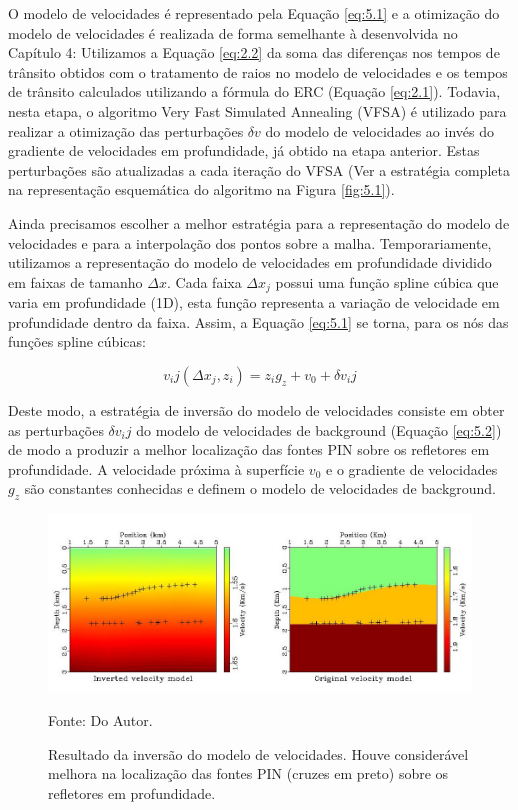 O modelo de velocidades é representado pela Equação \ref{eq:5.1} e a
otimização do modelo de velocidades é realizada de forma semelhante à desenvolvida no Capítulo 4:
Utilizamos a Equação \ref{eq:2.2} da soma das diferenças nos tempos de trânsito obtidos com o tratamento de raios no modelo de velocidades e os tempos de trânsito calculados utilizando a fórmula do ERC (Equação \ref{eq:2.1}). Todavia, nesta etapa, o algoritmo Very Fast Simulated Annealing (VFSA) é utilizado para realizar a otimização das perturbações $\delta v$ do modelo de velocidades ao invés do gradiente de velocidades em
profundidade, já obtido na etapa anterior. Estas perturbações são atualizadas a cada iteração do VFSA (Ver a estratégia completa na representação esquemática do algoritmo na Figura \ref{fig:5.1}).

Ainda precisamos escolher a melhor estratégia para a representação do modelo de velocidades
e para a interpolação dos pontos sobre a malha. Temporariamente, utilizamos a representação
do modelo de velocidades em profundidade dividido em faixas de tamanho $\Delta x$.
Cada faixa $\Delta x_j$ possui uma função spline cúbica que varia em profundidade
(1D), esta função representa a variação de velocidade em profundidade dentro da faixa.
Assim, a Equação \ref{eq:5.1} se torna, para os nós das funções spline cúbicas:

\begin{equation}
\label{eq:5.2}
v_ij(\Delta x_j,z_i)=z_i g_z+v_0+\delta v_ij
\end{equation}

Deste modo, a estratégia de inversão do modelo de velocidades consiste em obter
as perturbações $\delta v_ij$ do modelo de velocidades de background (Equação \ref{eq:5.2})
de modo a produzir a melhor localização das fontes PIN sobre os refletores em profundidade.
A velocidade próxima à superfície $v_0$ e o gradiente de velocidades $g_z$ são constantes conhecidas
e definem o modelo de velocidades de background.

\begin{figure}[H]
\caption{Resultado da inversão do modelo de velocidades. Houve considerável melhora na
localização das fontes PIN (cruzes em preto) sobre os refletores em profundidade.}
\begin{center}
\includegraphics[scale=2]{images/inverted-original.jpeg}
\vspace{-0.3cm}
\end{center}
\begin{center}
 Fonte: Do Autor.
\end{center}
\label{fig:5.2}
\end{figure}

